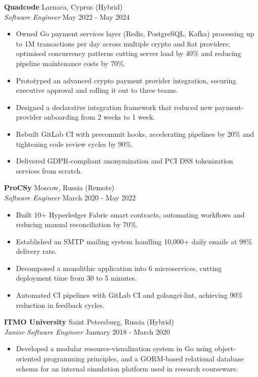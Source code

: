 \documentclass[11pt,a4paper]{article}
\newcommand{\jobentry}[4]{%
  \noindent\textbf{#1} \hfill #2\\
  \textit{#3} \hfill #4\par\vspace{2pt}
}
\begin{document}
\jobentry{Quadcode}{Larnaca, Cyprus (Hybrid)}{Software Engineer}{May 2022 - May 2024}
\begin{itemize}
\item Owned Go payment services layer (Redis, PostgreSQL, Kafka) processing up to 1M transactions per day across multiple crypto and fiat providers; optimised concurrency patterns cutting server load by 40\% and reducing pipeline maintenance costs by 70\%.
\item Prototyped an advanced crypto payment provider integration, securing executive approval and rolling it out to three teams.
\item Designed a declarative integration framework that reduced new payment-provider onboarding from 2 weeks to 1 week.
\item Rebuilt GitLab CI with precommit hooks, accelerating pipelines by 20\% and tightening code review cycles by 90\%.
\item Delivered GDPR-compliant anonymization and PCI DSS tokenization services from scratch.
\end{itemize}

\jobentry{ProCSy}{Moscow, Russia (Remote)}{Software Engineer}{March 2020 - May 2022}
\begin{itemize}
\item Built 10+ Hyperledger Fabric smart contracts, automating workflows and reducing manual reconciliation by 70\%.
\item Established an SMTP mailing system handling 10,000+ daily emails at 98\% delivery rate.
\item Decomposed a monolithic application into 6 microservices, cutting deployment time from 30 to 5 minutes.
\item Automated CI pipelines with GitLab CI and golangci-lint, achieving 90\% reduction in feedback cycles.
\end{itemize}

\jobentry{ITMO University}{Saint Petersburg, Russia (Hybrid)}{Junior Software Engineer}{January 2018 - March 2020}
\begin{itemize}
\item Developed a modular resource-visualization system in Go using object-oriented programming principles, and a GORM-based relational database schema for an internal simulation platform used in research courseware.
\end{itemize}

\end{document}
